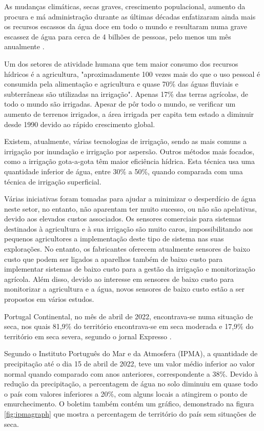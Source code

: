 \documentclass[conference]{IEEEtran}
\begin{document}
As mudanças climáticas, secas graves, crescimento populacional, aumento da
procura e má administração durante as últimas décadas enfatizaram ainda mais
os recursos escassos da água doce em todo o mundo e resultaram numa grave
escassez de água para cerca de 4 bilhões de pessoas, pelo menos um mês
anualmente \cite{jafari2018assessing} \cite{unicef2019progress} \cite{orimoloye2021spatial}. \cite{salehi2022global}

Um dos setores de atividade humana que tem maior consumo dos recursos hídricos
é a agricultura, "aproximadamente 100 vezes mais do que o uso pessoal é consumida
pela alimentação e agricultura e quase 70\% das águas fluviais e subterrâneas
são utilizadas na irrigação". \cite{nawandar2019iot} Apenas 17\% das terras
agrícolas, de todo o mundo são irrigadas. Apesar de pôr todo o mundo, se verificar
um aumento de terrenos irrigados, a área irrigada per capita tem estado a diminuir
desde 1990 devido ao rápido crescimento global. \cite{pimentelwater}

Existem, atualmente, várias tecnologias de irrigação, sendo as mais comuns
a irrigação por inundação e irrigação por aspersão. Outros métodos mais
focados, como a irrigação gota-a-gota têm maior eficiência hídrica. Esta
técnica usa uma quantidade inferior de água, entre 30\% a 50\%, quando
comparada com uma técnica de irrigação superficial. \cite{pimentelwater}

Várias iniciativas foram tomadas para ajudar a minimizar o desperdício
de água neste setor, no entanto, não aparentam ter muito sucesso,
ou não são apelativas, devido aos elevados custos associados.
Os sensores comerciais para sistemas destinados à agricultura e à sua
irrigação são muito caros, impossibilitando aos pequenos agricultores
a implementação deste tipo de sistema nas suas explorações. No entanto,
os fabricantes oferecem atualmente sensores de baixo custo que podem
ser ligados a aparelhos também de baixo custo para implementar sistemas de baixo custo para a gestão da
irrigação e monitorização agrícola. Além disso, devido ao interesse em
sensores de baixo custo para monitorizar a agricultura e a água,
novos sensores de baixo custo estão a ser propostos em vários estudos. \cite{garcia2020iot}

Portugal Continental, no mês de abril de 2022, encontrava-se numa situação de seca, nos
quais 81,9\% do território encontrava-se em seca moderada e 17,9\% do território em seca severa,
segundo o jornal Expresso \cite{expresso}.

Segundo o Instituto Português do Mar e da Atmosfera (IPMA),
a quantidade de precipitação até o dia 15 de abril de 2022, teve um valor médio inferior ao valor normal
quando comparado com anos anteriores, correspondente a 38\%. Devido à redução da precipitação,
a percentagem de água no solo diminuiu em quase todo o país com valores inferiores a 20\%, com alguns locais
a atingirem o ponto de emurchecimento. O boletim também contém um gráfico, demonstrado na figura \ref{fig:ipmagraph}
que mostra a percentagem de território do país sem situações de seca. \cite{ipmaboletim}
\end{document}
